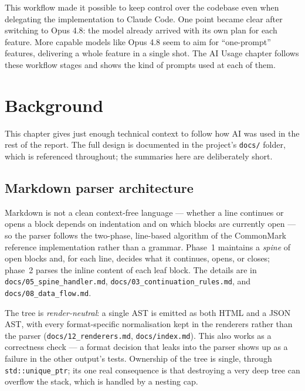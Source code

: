 \documentclass[12pt]{report}
\begin{document}
This workflow made it possible to keep control over the codebase even when delegating the implementation to Claude Code. One point became clear after switching to Opus 4.8: the model already arrived with its own plan for each feature. More capable models like Opus 4.8 seem to aim for ``one-prompt'' features, delivering a whole feature in a single shot. The AI Usage chapter follows these workflow stages and shows the kind of prompts used at each of them.

\chapter{Background}

This chapter gives just enough technical context to follow how AI was used in the rest of the report. The full design is documented in the project's \verb|docs/| folder, which is referenced throughout; the summaries here are deliberately short.

\section{Markdown parser architecture}

Markdown is not a clean context-free language --- whether a line continues or opens a block depends on indentation and on which blocks are currently open --- so the parser follows the two-phase, line-based algorithm of the CommonMark reference implementation rather than a grammar. Phase~1 maintains a \emph{spine} of open blocks and, for each line, decides what it continues, opens, or closes; phase~2 parses the inline content of each leaf block. The details are in \verb|docs/05_spine_handler.md|, \verb|docs/03_continuation_rules.md|, and \verb|docs/08_data_flow.md|.

The tree is \emph{render-neutral}: a single AST is emitted as both HTML and a JSON AST, with every format-specific normalisation kept in the renderers rather than the parser (\verb|docs/12_renderers.md|, \verb|docs/index.md|). This also works as a correctness check --- a format decision that leaks into the parser shows up as a failure in the other output's tests. Ownership of the tree is single, through \verb|std::unique_ptr|; its one real consequence is that destroying a very deep tree can overflow the stack, which is handled by a nesting cap.
\end{document}
